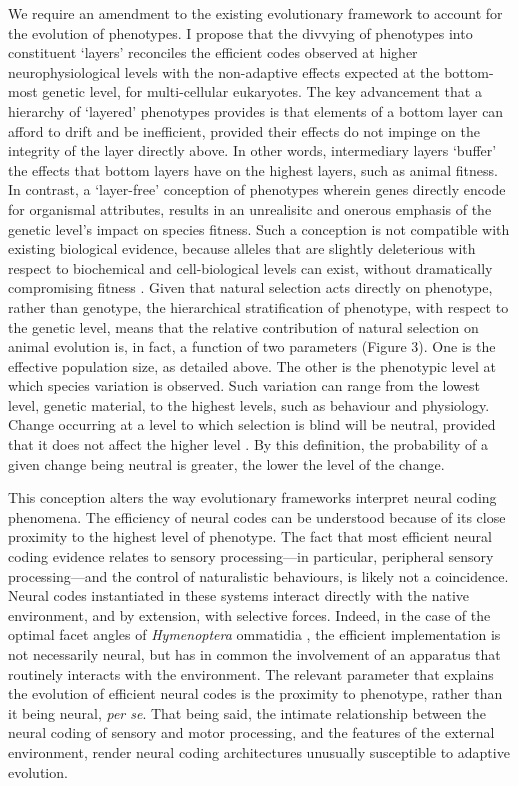 \documentclass{article}
\begin{document}
We require an amendment to the existing evolutionary framework to account for the evolution of phenotypes. I propose that the divvying of phenotypes into constituent `layers' \cite{Ho_Ohya_Zhang_2017, zhang_2018, wideman_doolittle_2019, mayr_1997} reconciles the efficient codes observed at higher neurophysiological levels with the non-adaptive effects expected at the bottom-most genetic level, for multi-cellular eukaryotes. The key advancement that a hierarchy of `layered' phenotypes provides is that elements of a bottom layer can afford to drift and be inefficient, provided their effects do not impinge on the integrity of the layer directly above. In other words, intermediary layers `buffer' the effects that bottom layers have on the highest layers, such as animal fitness. In contrast, a `layer-free' conception of phenotypes wherein genes directly encode for organismal attributes, results in an unrealisitc and onerous emphasis of the genetic level's impact on species fitness. Such a conception is not compatible with existing biological evidence, because alleles that are slightly deleterious with respect to biochemical and cell-biological levels can exist, without dramatically compromising fitness \cite{wideman_doolittle_2019}. Given that natural selection acts directly on phenotype, rather than genotype, the hierarchical stratification of phenotype, with respect to the genetic level, means that the relative contribution of natural selection on animal evolution is, in fact, a function of two parameters (Figure 3). One is the effective population size, as detailed above. The other is the phenotypic level at which species variation is observed. Such variation can range from the lowest level, genetic material, to the highest levels, such as behaviour and physiology. Change occurring at a level to which selection is blind will be neutral, provided that it does not affect the higher level \cite{mayr_1997, wideman_doolittle_2019, zhang_2018}. By this definition, the probability of a given change being neutral is greater, the lower the level of the change. 

This conception alters the way evolutionary frameworks interpret neural coding phenomena. The efficiency of neural codes can be understood because of its close proximity to the highest level of phenotype. The fact that most efficient neural coding evidence relates to sensory processing---in particular, peripheral sensory processing---and the control of naturalistic behaviours, is likely not a coincidence. Neural codes instantiated in these systems interact directly with the native environment, and by extension, with selective forces. Indeed, in the case of the optimal facet angles of \textit{Hymenoptera} ommatidia \cite{barlow_1952}, the efficient implementation is not necessarily neural, but has in common the involvement of an apparatus that routinely interacts with the environment. The relevant parameter that explains the evolution of efficient neural codes is the proximity to phenotype, rather than it being neural, \textit{per se}. That being said, the intimate relationship between the neural coding of sensory and motor processing, and the features of the external environment, render neural coding architectures unusually susceptible to adaptive evolution.
\end{document}

